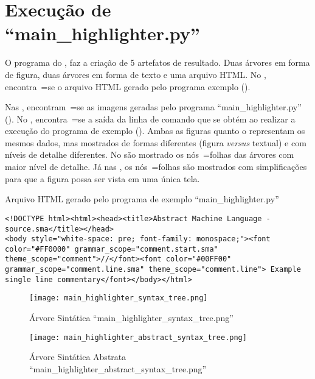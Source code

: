 \chapter[main\_highlighter.py]{Execução de ``main\_highlighter.py''}

O programa do ,
faz a criação de 5 artefatos de resultado.
Duas árvores em forma de figura,
duas árvores em forma de texto e
uma arquivo HTML.
No ,
encontra~=se o arquivo HTML gerado pelo programa exemplo ().

Nas ,
encontram~=se as imagens geradas pelo programa ``main\_highlighter.py'' ().
No ,
encontra~=se a saída da linha de comando que se obtém ao realizar a execução do programa de exemplo ().
Ambas as figuras  quanto o  representam os mesmos dados,
mas mostrados de formas diferentes (figura \textit{versus} textual) e
com níveis de detalhe diferentes.
No  são mostrado os nós~=folhas das árvores com maior nível de detalhe.
Já nas ,
os nós~=folhas são mostrados com simplificações para que a figura possa ser vista em uma única tela.
\begin{code}
\caption{Arquivo HTML gerado pelo programa de exemplo ``main\_highlighter.py''}
\label{MainHighlighterHtml}
\begin{verbatim}
<!DOCTYPE html><html><head><title>Abstract Machine Language - source.sma</title></head>
<body style="white-space: pre; font-family: monospace;"><font color="#FF0000" grammar_scope="comment.start.sma" theme_scope="comment">//</font><font color="#00FF00" grammar_scope="comment.line.sma" theme_scope="comment.line"> Example single line commentary</font></body></html>
\end{verbatim}
\end{code}

\begin{figure}[!htb]
\caption{Árvore Sintática ``main\_highlighter\_syntax\_tree.png''}
\label{MainHighlighterSyntaxTree}
\centering
\texttt{[image: main\_highlighter\_syntax\_tree.png]}
\end{figure}

\begin{figure}[!htb]
\caption{Árvore Sintática Abstrata ``main\_highlighter\_abstract\_syntax\_tree.png''}
\label{MainHighlighterAbstractSyntaxTree}
\centering
\texttt{[image: main\_highlighter\_abstract\_syntax\_tree.png]}
\end{figure}

